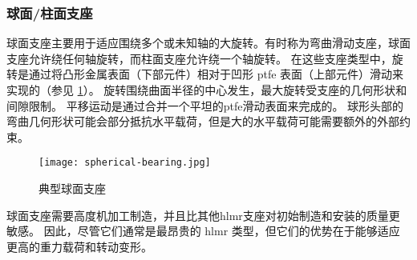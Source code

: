 \subsubsection{球面/柱面支座}
球面支座主要用于适应围绕多个或未知轴的大旋转。有时称为弯曲滑动支座，球面支座允许绕任何轴旋转，而柱面支座允许绕一个轴旋转。 在这些支座类型中，旋转是通过将凸形金属表面（下部元件）相对于凹形 \acrshort{ptfe} 表面（上部元件）滑动来实现的（参见 \cref{fig:spherical-bearing}）。 旋转围绕曲面半径的中心发生，最大旋转受支座的几何形状和间隙限制。 平移运动是通过合并一个平坦的\acrlong*{ptfe}滑动表面来完成的。 球形头部的弯曲几何形状可能会部分抵抗水平载荷，但是大的水平载荷可能需要额外的外部约束。

\begin{figure}
  \texttt{[image: spherical-bearing.jpg]}
  \caption{典型球面支座}
  \label{fig:spherical-bearing}
\end{figure}

球面支座需要高度机加工制造，并且比其他\acrlong*{hlmr}支座对初始制造和安装的质量更敏感。 因此，尽管它们通常是最昂贵的 \acrshort*{hlmr} 类型，但它们的优势在于能够适应更高的重力载荷和转动变形。

